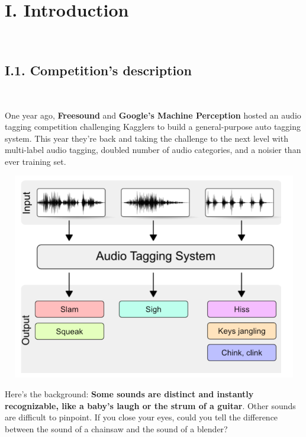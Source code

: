 \documentclass[11pt, a4papper]{report}
\theoremstyle{plain}
\theoremstyle{definition}
\theoremstyle{definition}
\theoremstyle{proposition}
\begin{document}


\chapter*{I. Introduction}
\

\section*{I.1. Competition's description}
\

One year ago, \textbf{Freesound} and \textbf{Google’s Machine Perception} hosted an audio tagging competition challenging Kagglers to build a general-purpose auto tagging system. This year they’re back and taking the challenge to the next level with multi-label audio tagging, doubled number of audio categories, and a noisier than ever training set. \cite{1}

\begin{center}
\includegraphics[width=16.5cm,height=9cm,keepaspectratio]{competiton-description.png}
\end{center}

Here's the background: \textbf{Some sounds are distinct and instantly recognizable, like a baby’s laugh or the strum of a guitar}. Other sounds are difficult to pinpoint. If you close your eyes, could you tell the difference between the sound of a chainsaw and the sound of a blender?
\\
\end{document}
